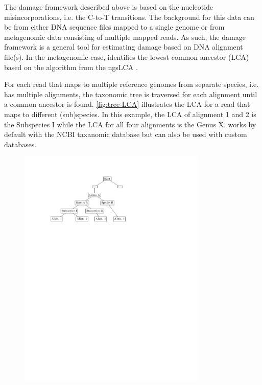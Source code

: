 The damage framework described above is based on the nucleotide misincorporations, i.e. the C-to-T transitions. The background for this data can be from either DNA sequence files mapped to a single genome or from metagenomic data consisting of multiple mapped reads. As such, the damage framework is a general tool for estimating damage based on DNA alignment file(s).
In the metagenomic case, \metaDMG identifies the lowest common ancestor (LCA) based on the algorithm from the ngsLCA \autocite{wangNgsLCAToolkitFasta}.

For each read that maps to multiple reference genomes from separate species, i.e. has multiple alignments, the taxonomic tree is traversed for each alignment until a common ancestor is found. \autoref{fig:tree-LCA} illustrates the LCA for a read that maps to different (sub)species. In this example, the LCA of alignment 1 and 2 is the Subspecies I while the LCA for all four alignments is the Genus X. \metaDMG works by default with the NCBI taxanomic database but can also be used with custom databases.

\begin{figure}[htbp]
    \centering
    \includegraphics[trim={3cm 19.5cm 8.5cm 2.3cm}, clip, width=0.8\textwidth]{figures/tree.pdf}
\end{figure}

